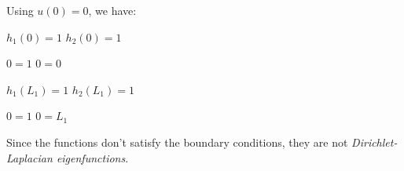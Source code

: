 \documentclass[12pt, executivepaper]{article}
\begin{document}
\begin{flushleft}
Using $u(0)=0$, we have: 

\begin{center}

$h_{1}(0)=1$ \quad \quad \quad $h_{2}(0)=1$

$0=1$ \quad \quad \quad $0=0$

\vspace{3mm}

$h_{1}(L_{1})=1$ \quad \quad \quad $h_{2}(L_{1})=1$

$0=1$ \quad \quad \quad $0=L_{1}$

\end{center}

Since the functions don't satisfy the boundary conditions, they are not \textit{Dirichlet-Laplacian eigenfunctions}.

\end{flushleft}

\vspace{5mm}
\end{document}
